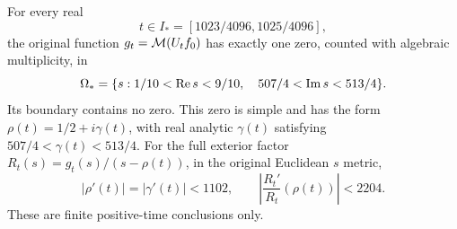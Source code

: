 \begin{pmreceivertheorem}
\label{pmreceiver:PMH10}
For every real
\begin{equation}\label{pmreceiver:PMH10-time}
 t\in I_*=[1023/4096,1025/4096],
\end{equation}
the original function $g_t=\mathcal M(U_tf_0)$ has exactly one zero,
counted with algebraic multiplicity, in
\begin{equation}\label{pmreceiver:PMH10-rectangle}
 \Omega_*=
 \{s:1/10<\operatorname{Re} s<9/10,\quad507/4<\operatorname{Im} s<513/4\}.
\end{equation}
Its boundary contains no zero. This zero is simple and has the form
$\rho(t)=1/2+i\gamma(t)$, with real analytic $\gamma(t)$ satisfying
$507/4<\gamma(t)<513/4$. For the full exterior factor
$R_t(s)=g_t(s)/(s-\rho(t))$, in the original Euclidean $s$ metric,
\begin{equation}\label{pmreceiver:PMH10-speed}
 |\rho'(t)|=|\gamma'(t)|<1102,\qquad
 \left|\frac{R_t'}{R_t}(\rho(t))\right|<2204.
\end{equation}
These are finite positive-time conclusions only.
\end{pmreceivertheorem}
